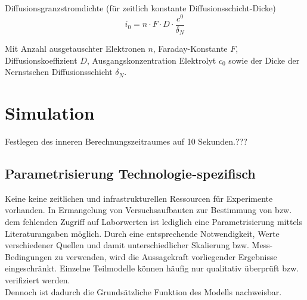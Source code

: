 \documentclass[onecolumn,10pt,titlepage]{article}
\begin{document}
Diffusionsgranzstromdichte (für zeitlich konstante Diffusionsschicht-Dicke)
\begin{equation}
i_0 = n \cdot F \cdot D \cdot \frac{c^0}{\delta_N}
\end{equation}

Mit Anzahl ausgetauschter Elektronen $n$, Faraday-Konstante $F$, Diffusionskoeffizient $D$, Ausgangskonzentration Elektrolyt $c_0$ sowie der Dicke der Nernstschen Diffusionsschicht $\delta_N$.





\section{Simulation}
Festlegen des inneren Berechnungszeitraumes auf 10 Sekunden.???
\subsection{Parametrisierung Technologie-spezifisch}
\label{subs_Par_je_TEch}
Keine keine zeitlichen und infrastrukturellen Ressourcen für Experimente vorhanden.
In Ermangelung von Versuchsaufbauten zur Bestimmung von bzw. dem fehlenden Zugriff auf Laborwerten ist lediglich eine Parametrisierung mittels Literaturangaben möglich. Durch eine entsprechende Notwendigkeit, Werte verschiedener Quellen und damit unterschiedlicher Skalierung bzw. Mess-Bedingungen zu verwenden, wird die Aussagekraft vorliegender Ergebnisse eingeschränkt. Einzelne Teilmodelle können häufig nur qualitativ überprüft bzw. verifiziert werden.\\
Dennoch ist dadurch die Grundsätzliche Funktion des Modells nachweisbar. %

\end{document}
